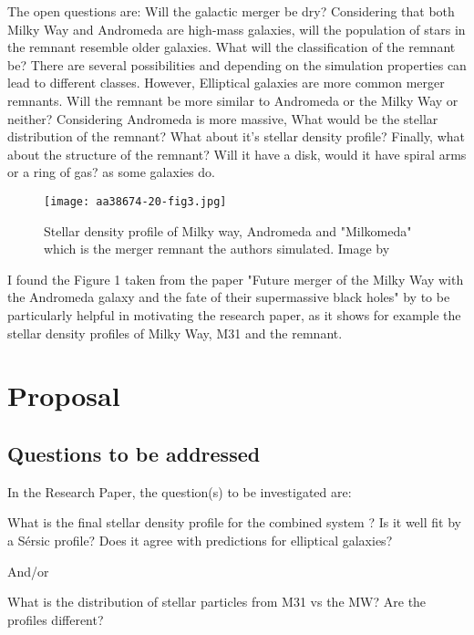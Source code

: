 \documentclass[linenumbers, preprint, times]{aastex631}
\begin{document}
The open questions are: Will the galactic merger be dry? Considering that both Milky Way and Andromeda are high-mass galaxies, will the population of stars in the remnant resemble older galaxies.
What will the classification of the remnant be? There are several possibilities and depending on the simulation properties can lead to different classes. However, Elliptical galaxies are more common merger remnants.
Will the remnant be more similar to Andromeda or the Milky Way or neither? Considering Andromeda is more massive, What would be the stellar distribution of the remnant? What about it's stellar density profile? Finally, what about the structure of the remnant? Will it have a disk, would it have spiral arms or a ring of gas? as some galaxies do. 
\begin{figure}
    \centering
    \texttt{[image: aa38674-20-fig3.jpg]}
    \caption{Stellar density profile of Milky way, Andromeda and "Milkomeda" which is the merger remnant the authors simulated. Image by \citet{Schiavi_2020} }
    \label{fig:galaxy}
\end{figure}
\par I found the Figure 1 taken from the paper "Future merger of the Milky Way with the Andromeda galaxy and the fate of their supermassive black holes" by \citet{Schiavi_2020} to be particularly helpful in motivating the research paper, as it shows for example the stellar density profiles of Milky Way, M31 and the remnant. 
\section{Proposal} \label{sec:style}
\subsection{Questions to be addressed}
In the Research Paper, the question(s) to be investigated are:\par
What is the final stellar density profile for the combined system ? Is it well fit by
a Sérsic profile? Does it agree with predictions for elliptical galaxies?\par
And/or \par
What is the distribution of stellar particles from M31 vs the MW? Are the profiles
different? \par
\end{document}
